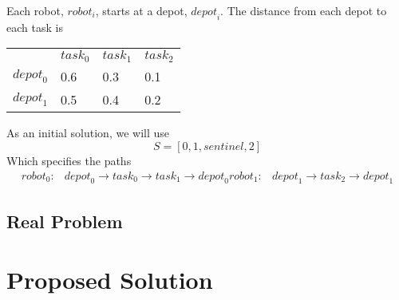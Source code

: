 \documentclass[a4paper]{article}
\begin{document}
Each robot, $\mathit{robot}_i$, starts at a depot, $\mathit{depot}_i$. The
distance from each depot to each task is

\begin{tabular}{llll}
                   & $\mathit{task}_0$ & $\mathit{task}_1$ & $\mathit{task}_2$ \\
$\mathit{depot}_0$ & 0.6               & 0.3               & 0.1               \\
$\mathit{depot}_1$ & 0.5               & 0.4               & 0.2               \\
\end{tabular}
\vspace{1.5em}

As an initial solution, we will use
$$S = [0, 1, \mathit{sentinel}, 2 ]$$
Which specifies the paths
\begin{align*}
\mathit{robot}_0: & \mathit{depot}_0 \rightarrow \mathit{task}_0 \rightarrow \mathit{task}_1 \rightarrow  \mathit{depot}_0
\mathit{robot}_1: & \mathit{depot}_1 \rightarrow \mathit{task}_2 \rightarrow \mathit{depot}_1
\end{align*}

\subsection{Real Problem}



\section{Proposed Solution}



\end{document}
